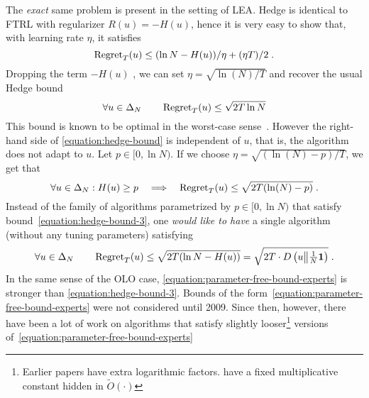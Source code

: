 The \emph{exact} same problem is present in the setting of \ac{LEA}.
Hedge is identical to \ac{FTRL} with regularizer $R(u) = -H(u)$, hence it is very easy to show that, with learning rate $\eta$, it satisfies
\begin{equation}
\label{equation:hedge-bound-2}
\operatorname{Regret}_T(u) \le (\ln N - H(u))/\eta + (\eta T)/2 \; .
\end{equation}
Dropping the term $-H(u)$ , we can set $\eta = \sqrt{\ln(N)/T}$ and recover the usual
Hedge bound~\citep{Freund-Schapire-1997}
\begin{equation}
\label{equation:hedge-bound}
\forall u \in \Delta_N \qquad \operatorname{Regret}_T(u) \le \sqrt{2 T \ln N}
\end{equation}
This bound is known to be optimal in the worst-case sense~\cite[Section
3.7]{Cesa-Bianchi-Lugosi-2006}. However the right-hand side of \eqref{equation:hedge-bound} is
independent of $u$, that is, the algorithm does not adapt to $u$.
Let $p \in [0, \ln N)$. If we choose $\eta = \sqrt{(\ln(N) - p)/T}$, we get that
\begin{equation}
\label{equation:hedge-bound-3}
\forall u \in \Delta_N: H(u) \ge p \quad \Longrightarrow \quad \operatorname{Regret}_T(u) \le \sqrt{2 T (\ln(N) - p)} \; .
\end{equation}
Instead of the family of algorithms parametrized by $p \in [0,\ln N)$ that
satisfy bound~\eqref{equation:hedge-bound-3}, one \emph{would like to have} a single
algorithm (without any tuning parameters) satisfying
\begin{equation}
\label{equation:parameter-free-bound-experts}
\forall u \in \Delta_N \qquad \operatorname{Regret}_T(u) \le \sqrt{2 T (\ln N - H(u))} = \sqrt{2T \cdot D\left({u}\middle\|{\tfrac{1}{N} \mathbf{1}}\right)} \; .
\end{equation}
In the same sense of the OLO case, \eqref{equation:parameter-free-bound-experts} is stronger than
\eqref{equation:hedge-bound-3}.
Bounds of the form~\eqref{equation:parameter-free-bound-experts} were not
considered until 2009. Since then, however, there have been a lot of work
\citep{Chaudhuri-Freund-Hsu-2009, Chernov-Vovk-2010, Koolen-van-Erven-2015,
Luo-Schapire-2014, Luo-Schapire-2015, Foster-Rakhlin-Sridharan-2015,
Orabona-Pal-2016-parameter-free} on algorithms that satisfy slightly
looser\footnote{Earlier papers have extra logarithmic factors.
\citet{Foster-Rakhlin-Sridharan-2015, Orabona-Pal-2016-parameter-free} have
a fixed multiplicative constant hidden in $\widetilde
O(\cdot)$} versions of~\eqref{equation:parameter-free-bound-experts}

